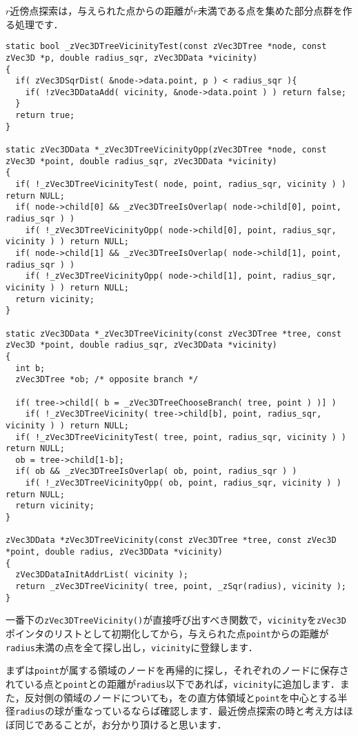 ﻿\documentclass[a4paper]{jsarticle}
\begin{document}
$r$近傍点探索は，与えられた点からの距離が$r$未満である点を集めた部分点群を作る処理です．
\begin{screen}
\begin{verbatim}
static bool _zVec3DTreeVicinityTest(const zVec3DTree *node, const zVec3D *p, double radius_sqr, zVec3DData *vicinity)
{
  if( zVec3DSqrDist( &node->data.point, p ) < radius_sqr ){
    if( !zVec3DDataAdd( vicinity, &node->data.point ) ) return false;
  }
  return true;
}

static zVec3DData *_zVec3DTreeVicinityOpp(zVec3DTree *node, const zVec3D *point, double radius_sqr, zVec3DData *vicinity)
{
  if( !_zVec3DTreeVicinityTest( node, point, radius_sqr, vicinity ) ) return NULL;
  if( node->child[0] && _zVec3DTreeIsOverlap( node->child[0], point, radius_sqr ) )
    if( !_zVec3DTreeVicinityOpp( node->child[0], point, radius_sqr, vicinity ) ) return NULL;
  if( node->child[1] && _zVec3DTreeIsOverlap( node->child[1], point, radius_sqr ) )
    if( !_zVec3DTreeVicinityOpp( node->child[1], point, radius_sqr, vicinity ) ) return NULL;
  return vicinity;
}

static zVec3DData *_zVec3DTreeVicinity(const zVec3DTree *tree, const zVec3D *point, double radius_sqr, zVec3DData *vicinity)
{
  int b;
  zVec3DTree *ob; /* opposite branch */

  if( tree->child[( b = _zVec3DTreeChooseBranch( tree, point ) )] )
    if( !_zVec3DTreeVicinity( tree->child[b], point, radius_sqr, vicinity ) ) return NULL;
  if( !_zVec3DTreeVicinityTest( tree, point, radius_sqr, vicinity ) ) return NULL;
  ob = tree->child[1-b];
  if( ob && _zVec3DTreeIsOverlap( ob, point, radius_sqr ) )
    if( !_zVec3DTreeVicinityOpp( ob, point, radius_sqr, vicinity ) ) return NULL;
  return vicinity;
}

zVec3DData *zVec3DTreeVicinity(const zVec3DTree *tree, const zVec3D *point, double radius, zVec3DData *vicinity)
{
  zVec3DDataInitAddrList( vicinity );
  return _zVec3DTreeVicinity( tree, point, _zSqr(radius), vicinity );
}
\end{verbatim}
\end{screen}
一番下の\verb|zVec3DTreeVicinity()|が直接呼び出すべき関数で，\verb|vicinity|を\verb|zVec3D|ポインタのリストとして初期化してから，与えられた点\verb|point|からの距離が\verb|radius|未満の点を全て探し出し，\verb|vicinity|に登録します．

まずは\verb|point|が属する領域のノードを再帰的に探し，それぞれのノードに保存されている点と\verb|point|との距離が\verb|radius|以下であれば，\verb|vicinity|に追加します．また，反対側の領域のノードについても，をの直方体領域と\verb|point|を中心とする半径\verb|radius|の球が重なっているならば確認します．最近傍点探索の時と考え方はほぼ同じであることが，お分かり頂けると思います．
\end{document}
